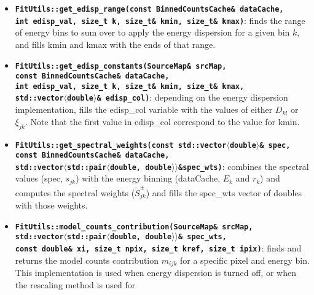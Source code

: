 \documentclass[preprint]{aastex}
\begin{document}
\begin{itemize}
\item{ {\bf {\tt FitUtils::get\_edisp\_range(const BinnedCountsCache\& dataCache,\\ \hspace{1in} 
        int edisp\_val, size\_t k, size\_t\& kmin, size\_t\& kmax)}}: finds the
    range of energy bins to sum over to apply the energy dispersion for a given bin $k$, and 
    fills kmin and kmax with the ends of that range.}
\item{ {\bf {\tt FitUtils::get\_edisp\_constants(SourceMap\& srcMap, \\ \hspace{1in} 
        const BinnedCountsCache\& dataCache,\\ \hspace{1in} 
        int edisp\_val, size\_t k, size\_t\& kmin, size\_t\& kmax,\\ \hspace{1in} 
        std::vector$\langle$double$\rangle$\& edisp\_col)}}: 
    depending on the energy dispersion implementation, fills the edisp\_col variable with the 
    values of either $D_{kl}$ or $\xi_{jk}$.  Note that the first value in edisp\_col correspond
    to the value for kmin.}
\item{ {\bf {\tt FitUtils::get\_spectral\_weights(const std::vector$\langle$double$\rangle$\& spec,\\ \hspace{1in} 
        const BinnedCountsCache\& dataCache,\\ \hspace{1in} 
        std::vector$\langle$std::pair$\langle$double, double$\rangle\rangle$\&spec\_wts)}}: combines
    the spectral values (spec, $s_{jk}$) with the energy binning (dataCache, $E_{k}$ and $r_{k}$) and computes
    the spectral weights ($\tilde{S}_{jk}^{\pm}$) and fills the spec\_wts vector of doubles
    with those weights.}
\item{ {\bf {\tt FitUtils::model\_counts\_contribution(SourceMap\& srcMap,\\ \hspace{1in}
        std::vector$\langle$std::pair$\langle$double, double$\rangle\rangle$\& spec\_wts, \\ \hspace{1in}
        const double\& xi, size\_t npix, size\_t kref, size\_t ipix)}}: finds 
    and returns the model counts contribution $m_{ijk}$ for a specific pixel and energy bin.  This implementation
    is used when energy dispersion is turned off, or when the rescaling method is used for 
}
\end{itemize}
\end{document}
